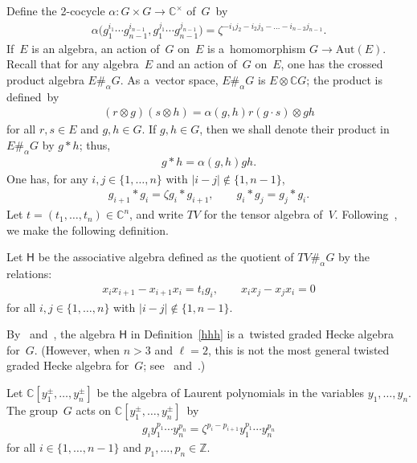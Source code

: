 \documentclass[pdftex]{sigma}
\numberwithin{equation}{section}
\begin{document}
Def\/ine the 2-cocycle $\alpha: G\times G\to {\mathbb{C}}^\times$ of~$G$~by
\begin{gather*}
\alpha\big(g_1^{i_1} \cdots g_{n-1}^{i_{n-1}}, g_1^{j_1} \cdots g_{n-1}^{j_{n-1}}\big) = \zeta^{-i_1j_2-i_2j_3-\dots -
i_{n-2}j_{n-1}}.
\end{gather*}
If~$E$ is an algebra, an action of~$G$ on~$E$ is a~homomorphism $G\to \mathrm{Aut}(E)$.
Recall that for any algebra~$E$ and an action of~$G$ on~$E$, one has the crossed product algebra $E\#_\alpha G$.
As a~vector space, $E\#_\alpha G$ is $E\otimes{\mathbb{C}} G$; the product is def\/ined~by
\begin{gather*}
(r\otimes g)(s\otimes h) = \alpha (g,h) r (g\cdot s) \otimes gh
\end{gather*}
for all $r,s \in E$ and $g,h\in G$.
If $g, h\in G$, then we shall denote their product in $E\#_\alpha G$ by $g*h$; thus,
\begin{gather*}
g* h = \alpha(g,h) gh.
\end{gather*}
One has, for any $i, j \in \{1,\ldots,n\}$ with $|i-j|\notin\{1, n-1\}$,
\begin{gather*}
g_{i+1}*g_i = \zeta g_i * g_{i+1},
\qquad
g_i *g_j = g_j *g_i.
\end{gather*}
Let $t=(t_1,\dots, t_n)\in {\mathbb{C}}^n$, and write $TV$ for the tensor algebra of~$V$.
Following~\cite[Examp\-le~2.16]{W}, we make the following def\/inition.

\begin{Definition}
\label{hhh}
Let $\mathsf{H}$ be the associative algebra def\/ined as the quotient of $TV\#_\alpha G$ by the relations:
\begin{gather*}
x_ix_{i+1}- x_{i+1} x_i = t_i g_i,
\qquad
x_ix_j - x_jx_i = 0
\end{gather*}
for all $i, j \in \{1,\ldots,n\}$ with $|i-j|\notin\{1, n-1\}$.
\end{Definition}

\begin{Remark}
By~\cite[Theorem 2.10]{W} and~\cite[Example 2.16]{W}, the algebra $\mathsf{H}$ in Def\/inition~\ref{hhh} is a~twisted
graded Hecke algebra for~$G$.
(However, when $n>3$ and $\ell=2$, this is not the most general twisted graded Hecke algebra for~$G$; see~\cite[Example 2.16]{W}
and~\cite[Example 5.1]{W2}.)
\end{Remark}

Let ${\mathbb{C}}[y_1^\pm, \ldots, y_n^\pm]$ be the algebra of Laurent polynomials in the variables $y_1,\ldots, y_n$.
The group~$G$ acts on ${\mathbb{C}}[y_1^\pm, \ldots, y_n^\pm]$~by
\begin{gather*}
g_i y_1^{p_1}\cdots y_n^{p_n} = \zeta^{p_i-p_{i+1}}y_1^{p_1}\cdots y_n^{p_n}
\end{gather*}
for all $i\in\{1,\ldots, n-1\}$ and $p_1,\ldots,p_n\in {\mathbb{Z}}$.
\end{document}
